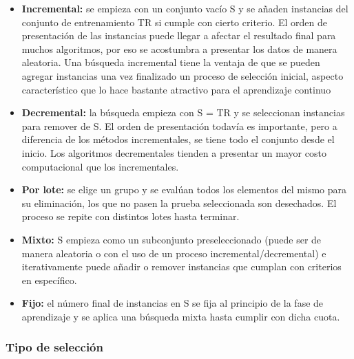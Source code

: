 \begin{itemize}
\item \textbf{Incremental:}
se empieza con un conjunto vacío S y se añaden instancias del conjunto de entrenamiento TR si cumple con cierto criterio. El orden de presentación de las instancias puede llegar a afectar el resultado final para muchos algoritmos, por eso se acostumbra a presentar los datos de manera aleatoria. Una búsqueda incremental tiene la ventaja de que se pueden agregar instancias una vez finalizado un proceso de selección inicial, aspecto característico que lo hace bastante atractivo para el aprendizaje continuo

\item \textbf{Decremental:}
la búsqueda empieza con S = TR  y se seleccionan instancias para remover de S. El orden de presentación todavía es importante, pero a diferencia de los métodos incrementales, se tiene todo el conjunto desde el inicio. Los algoritmos decrementales tienden a presentar un mayor costo computacional que los incrementales.

\item \textbf{Por lote:}
se elige un grupo y se evalúan todos los elementos del mismo para su eliminación, los que no pasen la prueba seleccionada son desechados. El proceso se repite con distintos lotes hasta terminar.

\item \textbf{Mixto:}
S empieza como un subconjunto preseleccionado (puede ser de manera aleatoria o con el uso de un proceso incremental/decremental) e iterativamente puede añadir o remover instancias que cumplan con criterios en específico.

\item \textbf{Fijo:}
el número final de instancias en S se fija al principio de la fase de aprendizaje y se aplica una búsqueda mixta hasta cumplir con dicha cuota.
\end{itemize}

\subsubsection{Tipo de selección}

